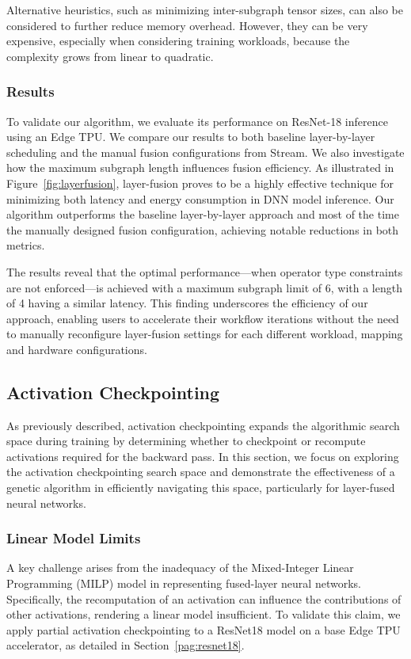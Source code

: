 \documentclass[lettersize,journal]{IEEEtran}
\begin{document}
Alternative heuristics, such as minimizing inter-subgraph tensor sizes, can also be considered to further reduce memory overhead. However, they can be very expensive, especially when considering training workloads, because the complexity grows from linear to quadratic.

\subsubsection{Results}

To validate our algorithm, we evaluate its performance on ResNet-18 inference using an Edge TPU. We compare our results to both baseline layer-by-layer scheduling and the manual fusion configurations from Stream. We also investigate how the maximum subgraph length influences fusion efficiency.
As illustrated in Figure~\ref{fig:layerfusion}, layer-fusion proves to be a highly effective technique for minimizing both latency and energy consumption in DNN model inference. Our algorithm outperforms the baseline layer-by-layer approach and most of the time the manually designed fusion configuration, achieving notable reductions in both metrics.

The results reveal that the optimal performance—when operator type constraints are not enforced—is achieved with a maximum subgraph limit of 6, with a length of 4 having a similar latency. This finding underscores the efficiency of our approach, enabling users to accelerate their workflow iterations without the need to manually reconfigure layer-fusion settings for each different workload, mapping and hardware configurations.

\subsection{Activation Checkpointing}\label{pag:AC}

\label{subsec:activation_checkpointing}

As previously described, activation checkpointing expands the algorithmic search space during training by determining whether to checkpoint or recompute activations required for the backward pass. In this section, we focus on exploring the activation checkpointing search space and demonstrate the effectiveness of a genetic algorithm in efficiently navigating this space, particularly for layer-fused neural networks.

\subsubsection{Linear Model Limits}
A key challenge arises from the inadequacy of the Mixed-Integer Linear Programming (MILP) model in representing fused-layer neural networks. Specifically, the recomputation of an activation can influence the contributions of other activations, rendering a linear model insufficient. To validate this claim, we apply partial activation checkpointing to a ResNet18 model on a base Edge TPU accelerator, as detailed in Section~\ref{pag:resnet18}.
\end{document}
